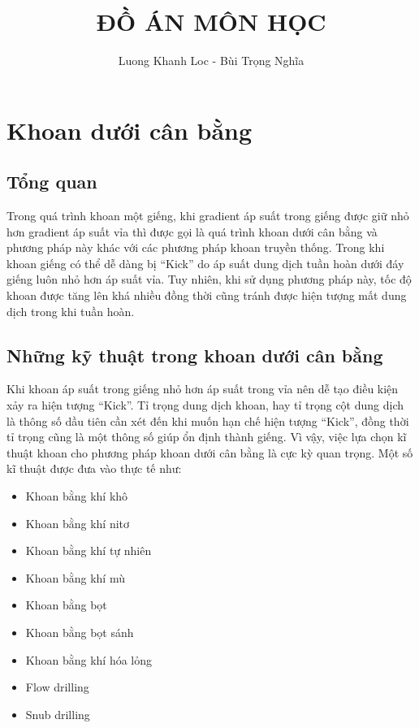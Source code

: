 \documentclass[13pt,a4paper]{article}
\title{\textbf{ĐỒ ÁN MÔN HỌC}}
\author{Luong Khanh Loc - Bùi Trọng Nghĩa}
\begin{document}
\tableofcontents
\maketitle
\section{Khoan dưới cân bằng}
\subsection{Tổng quan}
	Trong quá trình khoan một giếng, khi gradient áp suất trong giếng được giữ nhỏ hơn gradient áp suất vỉa thì được gọi là quá trình khoan dưới cân bằng và phương pháp này khác với các phương pháp khoan truyền thống. Trong khi khoan giếng có thể dễ dàng bị ``Kick'' do áp suất dung dịch tuần hoàn dưới đáy giếng luôn nhỏ hơn áp suất vỉa. Tuy nhiên, khi sử dụng phương pháp này, tốc độ khoan được tăng lên khá nhiều đồng thời cũng tránh được hiện tượng mất dung dịch trong khi tuần hoàn. 
\subsection{Những kỹ thuật trong khoan dưới cân bằng}
	Khi khoan áp suất trong giếng nhỏ hơn áp suất trong vỉa nên dễ tạo điều kiện xảy ra hiện tượng “Kick”. Tỉ trọng dung dịch khoan, hay tỉ trọng cột dung dịch là thông số dầu tiên cần xét đến khi muốn hạn chế hiện tượng “Kick”, đồng thời tỉ trọng cũng là một thông số giúp ổn định thành giếng. Vì vậy, việc lựa chọn kĩ thuật khoan cho phương pháp khoan dưới cân bằng là cực kỳ quan trọng. Một số kĩ thuật được đưa vào thực tế như:
	\begin{itemize}
		\item Khoan bằng khí khô
		\item Khoan bằng khí nitơ
		\item Khoan bằng khí tự nhiên 
		\item Khoan bằng khí mù
		\item Khoan bằng bọt
		\item Khoan bằng bọt sánh
		\item Khoan bằng khí hóa lỏng
		\item Flow drilling
		\item Snub drilling
	\end{itemize}
\end{document}
